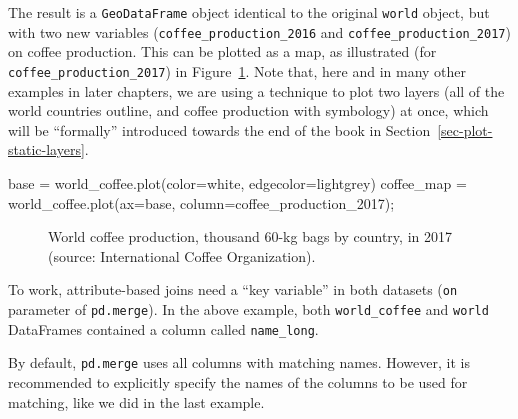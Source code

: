 \documentclass[
  letterpaper,
]{krantz}
\newenvironment{Shaded}{\begin{snugshade}}{\end{snugshade}}
\newcommand{\NormalTok}[1]{\textcolor[rgb]{0.00,0.23,0.31}{#1}}
\newcommand{\OperatorTok}[1]{\textcolor[rgb]{0.37,0.37,0.37}{#1}}
\newcommand{\StringTok}[1]{\textcolor[rgb]{0.13,0.47,0.30}{#1}}
\begin{document}
The result is a \texttt{GeoDataFrame} object identical to the original
\texttt{world} object, but with two new variables
(\texttt{coffee\_production\_2016} and
\texttt{coffee\_production\_2017}) on coffee production. This can be
plotted as a map, as illustrated (for \texttt{coffee\_production\_2017})
in Figure~\ref{fig-join-coffee-production}. Note that, here and in many
other examples in later chapters, we are using a technique to plot two
layers (all of the world countries outline, and coffee production with
symbology) at once, which will be ``formally'' introduced towards the
end of the book in Section~\ref{sec-plot-static-layers}.

\begin{Shaded}
\begin{Highlighting}[]
\NormalTok{base }\OperatorTok{=}\NormalTok{ world\_coffee.plot(color}\OperatorTok{=}\StringTok{\textquotesingle{}white\textquotesingle{}}\NormalTok{, edgecolor}\OperatorTok{=}\StringTok{\textquotesingle{}lightgrey\textquotesingle{}}\NormalTok{)}
\NormalTok{coffee\_map }\OperatorTok{=}\NormalTok{ world\_coffee.plot(ax}\OperatorTok{=}\NormalTok{base, column}\OperatorTok{=}\StringTok{\textquotesingle{}coffee\_production\_2017\textquotesingle{}}\NormalTok{)}\OperatorTok{;}
\end{Highlighting}
\end{Shaded}

\begin{figure}[H]


\caption{\label{fig-join-coffee-production}World coffee production,
thousand 60-kg bags by country, in 2017 (source: International Coffee
Organization).}

\end{figure}%

To work, attribute-based joins need a ``key variable'' in both datasets
(\texttt{on} parameter of \texttt{pd.merge}). In the above example, both
\texttt{world\_coffee} and \texttt{world} DataFrames contained a column
called \texttt{name\_long}.

\begin{tcolorbox}[enhanced jigsaw, title=\textcolor{quarto-callout-note-color}{\faInfo}\hspace{0.5em}{Note}, arc=.35mm, toprule=.15mm, titlerule=0mm, colframe=quarto-callout-note-color-frame, breakable, toptitle=1mm, bottomtitle=1mm, rightrule=.15mm, colbacktitle=quarto-callout-note-color!10!white, leftrule=.75mm, left=2mm, bottomrule=.15mm, opacityback=0, coltitle=black, opacitybacktitle=0.6, colback=white]

By default, \texttt{pd.merge} uses all columns with matching names.
However, it is recommended to explicitly specify the names of the
columns to be used for matching, like we did in the last example.

\end{tcolorbox}
\end{document}
